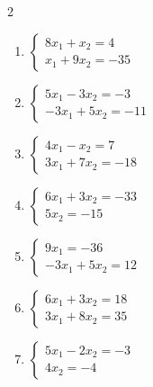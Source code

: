 \begin{multicols}{2}
\begin{enumerate}[label=\arabic*., leftmargin=*]
\item $\begin{cases}8x_1+x_2=4\\x_1+9x_2=-35\end{cases}$
\item $\begin{cases}5x_1-3x_2=-3\\-3x_1+5x_2=-11\end{cases}$
\item $\begin{cases}4x_1-x_2=7\\3x_1+7x_2=-18\end{cases}$
\item $\begin{cases}6x_1+3x_2=-33\\5x_2=-15\end{cases}$
\item $\begin{cases}9x_1=-36\\-3x_1+5x_2=12\end{cases}$
\item $\begin{cases}6x_1+3x_2=18\\3x_1+8x_2=35\end{cases}$
\item $\begin{cases}5x_1-2x_2=-3\\4x_2=-4\end{cases}$
\end{enumerate}
\end{multicols}

